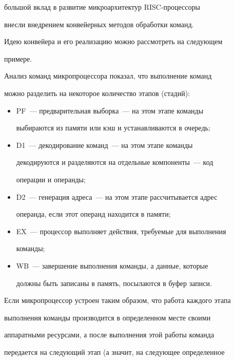 большой вклад в развитие микроархитектур RISC-про\-цес\-со\-ры 


внесли внедрением конвейерных методов обработки команд. 


  


Идею конвейера и его реализацию можно рассмотреть на следующем 


примере.


 


 Анализ команд  микропроцессора показал, что выполнение  команд 


можно разделить на некоторое количество этапов (стадий):


 \begin{itemize}


\item PF~--- предварительная выборка~--- на этом этапе команды      


выбираются из памяти или кэш и устанавливаются в очередь;


\item D1~---  декодирование команд~--- на этом этапе команды 


декодируются и разделяются на отдельные компоненты~--- код 


операции и операнды;


\item D2~--- генерация адреса~--- на этом этапе рассчитывается адрес 


операнда, если этот операнд находится в памяти;


\item EX~--- процессор выполняет действия, требуемые для выполнения 


команды;


\item WB~--- завершение выполнения команды, а данные, которые 


должны быть записаны в память, посылаются в буфер записи.  


\end{itemize}





Если микропроцессор устроен таким образом, что работа каждого этапа 


выполнения команды производится в  определенном месте  своими 


аппаратными ресурсами, а после выполнения этой работы команда 


передается на следующий этап (а значит, на следующее определенное 


